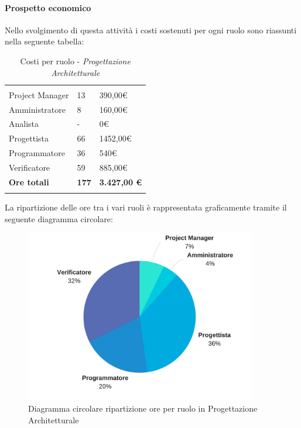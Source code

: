 			\paragraph{Prospetto economico} \Spazio
			Nello svolgimento di questa attività i costi sostenuti per ogni ruolo sono riassunti nella seguente tabella:
			\begin{table}[H]
			\centering
			\begin{tabular}{|p{4cm}|C{4cm}|C{4cm}|}
				
				 & &\\
				Project Manager & 13 & 390,00\euro \\
				\hline
				Amministratore& 8 & 160,00\euro \\
				\hline
				Analista & - & 0\euro \\
				\hline
				Progettista & 66 & 1452,00\euro \\
				\hline
				Programmatore & 36 & 540\euro \\
				\hline
				Verificatore & 59 & 885,00\euro \\
				\hline
				\textbf{Ore totali} & \textbf{177} & \textbf{3.427,00 \euro} \\
			\end{tabular}
			\caption{Costi per ruolo - \textit{Progettazione Architetturale}}
		\end{table}
		
		La ripartizione delle ore tra i vari ruoli è rappresentata graficamente tramite il seguente diagramma circolare:
		
		\begin{figure}[H] 
			\centering 
			\includegraphics[width=0.9\textwidth]{images/CircolareProgettazioneArchitetturale.png} 
			\caption{Diagramma circolare ripartizione ore per ruolo in Progettazione Architetturale}
			\label{CircolareProgettazioneArchitetturale}
		\end{figure}		

